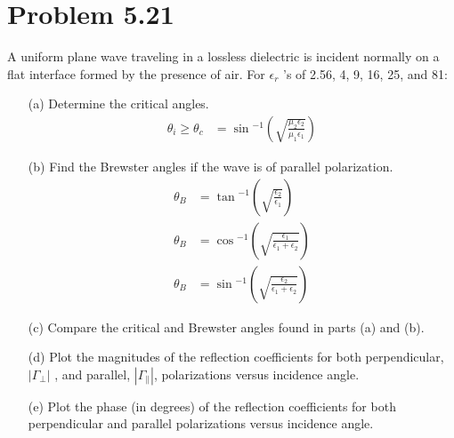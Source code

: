 \documentclass[12pt]{article}
\begin{document}
\section*{Problem 5.21}
A uniform plane wave traveling in a lossless dielectric is incident normally on a flat interface formed by the presence of air. For $\epsilon_r$ ’s of 2.56, 4, 9, 16, 25, and 81:
\begin{itemize}
\item[(a)] Determine the critical angles.\\
  \begin{align*}
    \theta_i \geq \theta_c &= \sin{^{-1}\left(\sqrt{\frac{\mu_2\epsilon_2}{\mu_1\epsilon_1}}\right)}
  \end{align*}
\item[(b)] Find the Brewster angles if the wave is of parallel polarization.
  \begin{align*}
    \theta_B &= \tan{^{-1}\left(\sqrt{\frac{\epsilon_2}{\epsilon_1}}\right)}\\
    \theta_B &= \cos{^{-1}\left(\sqrt{\frac{\epsilon_1}{\epsilon_1 + \epsilon_2}}\right)}\\
    \theta_B &= \sin{^{-1}\left(\sqrt{\frac{\epsilon_2}{\epsilon_1 + \epsilon_2}}\right)}
  \end{align*}
\item[(c)] Compare the critical and Brewster angles found in parts (a) and (b).
\item[(d)] Plot the magnitudes of the reflection coefficients for both perpendicular, $|\Gamma_{\perp}|$ , and parallel, $|\Gamma_{\parallel}|$, polarizations versus incidence angle.
\item[(e)] Plot the phase (in degrees) of the reflection coefficients for both perpendicular
and parallel polarizations versus incidence angle.
\end{itemize}


 
\end{document}
